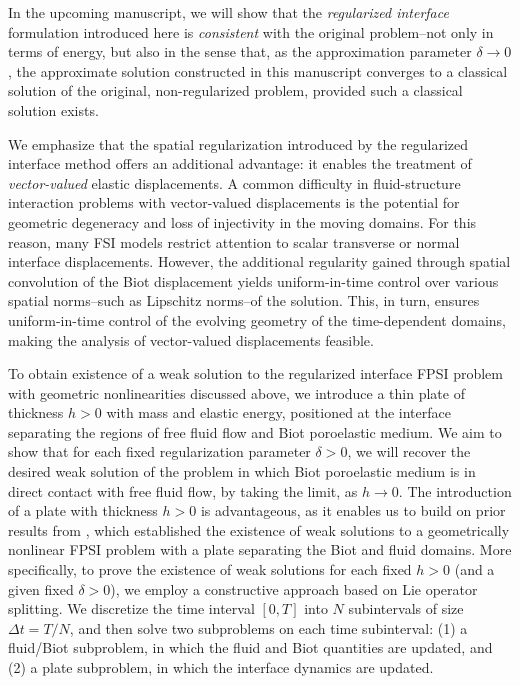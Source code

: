 \documentclass[11pt]{article}
\theoremstyle{definition}
\begin{document}
In the upcoming manuscript, we will show that the {\emph{regularized interface}} formulation introduced here is {\emph{consistent}} with the original problem--not only in terms of energy, but also in the sense that, as the approximation parameter $\delta \to 0$, the approximate solution constructed in this manuscript converges to a classical solution of the original, non-regularized problem, provided such a classical solution exists.

We emphasize that the spatial regularization introduced by the regularized interface method offers an additional advantage: it enables the treatment of \textit{vector-valued} elastic displacements. A common difficulty in fluid-structure interaction problems with vector-valued displacements is the potential for geometric degeneracy and loss of injectivity in the moving domains. For this reason, many FSI models restrict attention to scalar transverse or normal interface displacements. However, the additional regularity gained through spatial convolution of the Biot displacement yields uniform-in-time control over various spatial norms--such as Lipschitz norms--of the solution. This, in turn, ensures uniform-in-time control of the evolving geometry of the time-dependent domains, making the analysis of vector-valued displacements feasible.

To obtain existence of a weak solution to the regularized interface FPSI problem with geometric nonlinearities discussed above, we introduce a thin plate  of thickness $h>0$ with mass and elastic energy, positioned at the interface separating the regions of free fluid flow and Biot poroelastic medium.
We aim to show that for each fixed regularization parameter $\delta > 0$, we will recover the desired weak solution of the problem in which Biot poroelastic medium is in direct contact with free fluid flow, by taking the limit, as $h \to 0$.
The introduction of a plate with thickness $h > 0$ is advantageous, as it enables us to build on prior results from \cite{FPSIJMPA}, which established the existence of weak solutions to a geometrically nonlinear FPSI problem with a plate separating the Biot and fluid domains.
More specifically, to prove the existence of weak solutions for each fixed $h > 0$ (and a given fixed $\delta > 0$), we employ a constructive approach based on Lie operator splitting. We discretize the time interval $[0, T]$ into $N$ subintervals of size $\Delta t = T/N$, and then solve two subproblems on each time subinterval:
(1) a fluid/Biot subproblem, in which the fluid and Biot quantities are updated, and
(2) a plate subproblem, in which the interface dynamics are updated.
\end{document}
